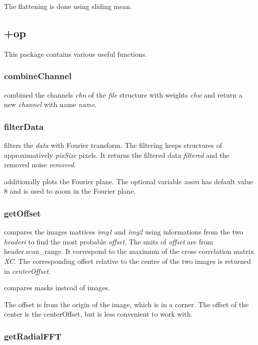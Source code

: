 The flattening is done using sliding mean.

\subsection{+op}
This package contains various useful functions.
\subsubsection{combineChannel}
\bdf
{} combined the channels \emph{chn} of the \emph{file} structure with weights \emph{chw} and return a new \emph{channel} with name \emph{name}.
\edf

\subsubsection{filterData}
\bdf
{} filters the \emph{data} with Fourier transform. The filtering keeps structures of approximatively \emph{pixSize} pixels. It returns the filtered data \emph{filtered} and the removed noise \emph{removed}.

 additionally plots the Fourier plane. The optional variable \emph{zoom} has default value $8$ and is used to zoom in the Fourier plane.

\edf

\subsubsection{getOffset}
\bdf
{} compares the images matrices \emph{img1} and \emph{img2} using informations from the two \emph{headeri} to find the most probable \emph{offset}. The units of \emph{offset} are from header.scan\_range. It correspond to the maximum of the cross correlation matrix \emph{XC}. The corresponding offset relative to the centre of the two images is returned in \emph{centerOffset}.  


 compares masks instead of images.
\edf

The offset is from the origin of the image, which is in a corner. The offset of the center is the centerOffset, but is less convenient to work with.

\subsubsection{getRadialFFT}

